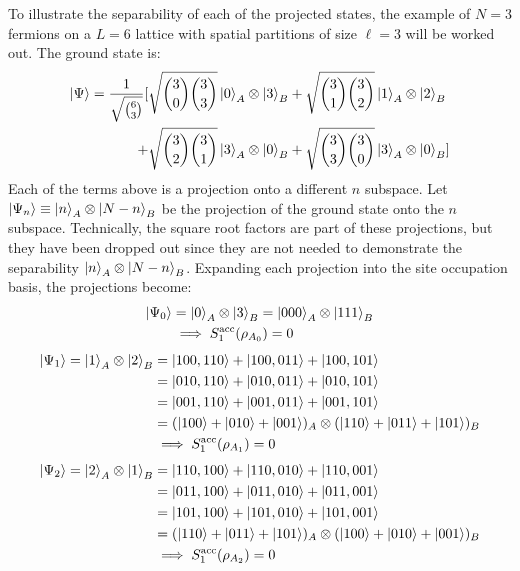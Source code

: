 To illustrate the separability of each of the projected states, the example of $N=3$ fermions on a $L=6$ lattice with spatial partitions of size $\ell=3$ will be worked out. The ground state is:
%
\begin{align}
\ket{\Psi} = \frac{1}{\sqrt{{{6}\choose{3}}}} [ &\sqrt{{{3}\choose{0}}{{3}\choose{3}}} \ket{0}_A \otimes \ket{3}_B + \sqrt{{{3}\choose{1}}{{3}\choose{2}}} \ket{1}_A \otimes \ket{2}_B \nonumber \\
+ &\sqrt{{{3}\choose{2}}{{3}\choose{1}}} \ket{3}_A \otimes \ket{0}_B +\sqrt{{{3}\choose{3}}{{3}\choose{0}}} \ket{3}_A \otimes \ket{0}_B ] 
\end{align}
%
Each of the terms above is a projection onto a different $n$ subspace. Let $\ket{\Psi_n} \equiv \ket{n}_A \otimes \ket{N-n}_B$ be the projection of the ground state onto the $n$ subspace. Technically, the square root factors are part of these projections, but they have been dropped out since they are not needed to demonstrate the separability $\ket{n}_A \otimes \ket{N-n}_B$. Expanding each projection into the site occupation basis, the projections become:
%
\begin{align}
\ket{\Psi_0} &=  \ket{0}_A \otimes \ket{3}_B = \ket{000}_A\otimes\ket{111}_B \nonumber \\
&\implies S_1^{\rm acc}(\rho_{A_{0}}) = 0
\end{align}
%
%
\begin{align}
\ket{\Psi_1} =  \ket{1}_A \otimes \ket{2}_B &= \ket{100,110} + \ket{100,011} + \ket{100,101} \nonumber \\
&= \ket{010,110} + \ket{010,011} + \ket{010,101} \nonumber \\
&= \ket{001,110} + \ket{001,011} + \ket{001,101} \nonumber \\
&= (\ket{100} + \ket{010} + \ket{001})_A \otimes (\ket{110} + \ket{011} + \ket{101})_B \nonumber \\
&\implies S_1^{\rm acc}(\rho_{A_{1}}) = 0
\end{align}
%
%
\begin{align}
\ket{\Psi_2} =  \ket{2}_A \otimes \ket{1}_B &= \ket{110,100} + \ket{110,010} + \ket{110,001} \nonumber \\
&= \ket{011,100} + \ket{011,010} + \ket{011,001} \nonumber \\
&= \ket{101,100} + \ket{101,010} + \ket{101,001} \nonumber \\
&= (\ket{110} + \ket{011} + \ket{101})_A \otimes (\ket{100} + \ket{010} + \ket{001})_B \nonumber \\
&\implies S_1^{\rm acc}(\rho_{A_{2}}) = 0
\end{align}
